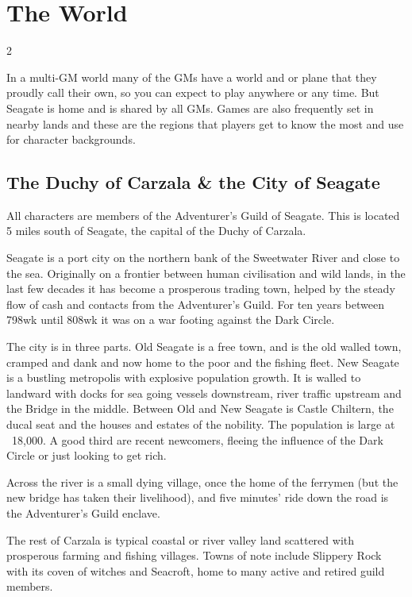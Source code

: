 \section{The World}

\begin{multicols}{2}
  
In a multi-GM world many of the GMs have a world and or plane that
they proudly call their own, so you can expect to play anywhere or any
time. But Seagate is home and is shared by all GMs. Games are also
frequently set in nearby lands and these are the regions that players
get to know the most and use for character backgrounds.

\subsection{The Duchy of Carzala \& the City of Seagate}

All characters are members of the Adventurer's Guild of Seagate. This
is located 5 miles south of Seagate, the capital of the Duchy of
Carzala.

Seagate is a port city on the northern bank of
the Sweetwater River and close to the sea.
Originally on a frontier between human
civilisation and wild lands, in the last few
decades it has become a prosperous trading
town, helped by the steady flow of cash and
contacts from the Adventurer's Guild. For ten
years between 798wk until 808wk it was on a
war footing against the Dark Circle.

The city is in three parts. Old Seagate is a free town, and is the old
walled town, cramped and dank and now home to the poor and the fishing
fleet. New Seagate is a bustling metropolis with explosive population
growth. It is walled to landward with docks for sea going vessels
downstream, river traffic upstream and the Bridge in the middle.
Between Old and New Seagate is Castle Chiltern, the ducal seat and the
houses and estates of the nobility. The population is large at
~18,000. A good third are recent newcomers, fleeing the influence of
the Dark Circle or just looking to get rich.

Across the river is a small dying village, once the home of the
ferrymen (but the new bridge has taken their livelihood), and five
minutes' ride down the road is the Adventurer's Guild enclave.

The rest of Carzala is typical coastal or river valley land scattered
with prosperous farming and fishing villages. Towns of note include
Slippery Rock with its coven of witches and Seacroft, home to many
active and retired guild members.


\end{multicols}

